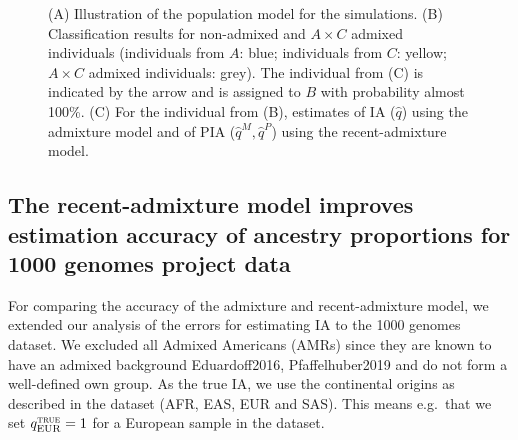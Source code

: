 \documentclass[12pt]{article}
\theoremstyle{definition}
\begin{document}
\begin{figure}
{  }   \caption{(A) Illustration of the population model for the simulations. (B) Classification results for non-admixed and $A\times C$ admixed individuals (individuals from $A$: blue; individuals from $C$: yellow; $A\times C$ admixed individuals: grey). The individual from (C) is indicated by the arrow and is assigned to $B$ with probability almost 100\%. (C) For the individual from (B), estimates of IA ($\hat q$) using the admixture model and of PIA ($\hat q^M, \hat q^P$) using the recent-admixture model.}
  \label{fig:sim1}
\end{figure}


 \subsection{The recent-admixture model improves estimation accuracy of ancestry proportions for 1000 genomes project data}
For comparing the accuracy of the admixture and recent-admixture model, we extended our analysis of the errors for estimating IA to the 1000 genomes dataset. We excluded all Admixed Americans (AMRs) since they are known to have an admixed background \cite{article}{Eduardoff2016, Pfaffelhuber2019} and do not form a well-defined own group. As the true IA, we use the continental origins as described in the dataset (AFR, EAS, EUR and SAS). This means e.g.\ that we set $q^{\text{\sc true}}_{\text{EUR}}=1$ for a European sample in the dataset.
\end{document}
